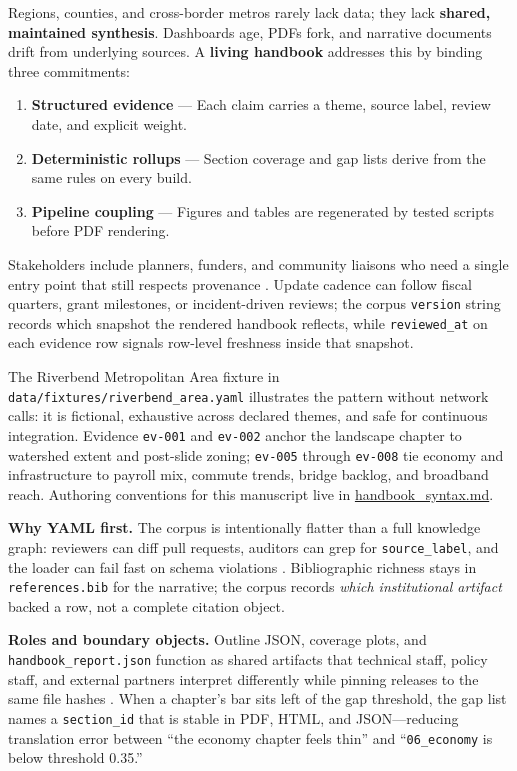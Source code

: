 \documentclass[
]{article}
\providecommand{\tightlist}{%
  \setlength{\itemsep}{0pt}\setlength{\parskip}{0pt}}
\begin{document}
Regions, counties, and cross-border metros rarely lack data; they lack
\textbf{shared, maintained synthesis}. Dashboards age, PDFs fork, and
narrative documents drift from underlying sources. A \textbf{living
handbook} addresses this by binding three commitments:

\begin{enumerate}
\def\labelenumi{\arabic{enumi}.}
\tightlist
\item
  \textbf{Structured evidence} --- Each claim carries a theme, source
  label, review date, and explicit weight.
\item
  \textbf{Deterministic rollups} --- Section coverage and gap lists
  derive from the same rules on every build.
\item
  \textbf{Pipeline coupling} --- Figures and tables are regenerated by
  tested scripts before PDF rendering.
\end{enumerate}

Stakeholders include planners, funders, and community liaisons who need
a single entry point that still respects provenance \citep{gray2005}.
Update cadence can follow fiscal quarters, grant milestones, or
incident-driven reviews; the corpus \texttt{version} string records
which snapshot the rendered handbook reflects, while
\texttt{reviewed\_at} on each evidence row signals row-level freshness
inside that snapshot.

The Riverbend Metropolitan Area fixture in
\texttt{data/fixtures/riverbend\_area.yaml} illustrates the pattern
without network calls: it is fictional, exhaustive across declared
themes, and safe for continuous integration. Evidence \texttt{ev-001}
and \texttt{ev-002} anchor the landscape chapter to watershed extent and
post-slide zoning; \texttt{ev-005} through \texttt{ev-008} tie economy
and infrastructure to payroll mix, commute trends, bridge backlog, and
broadband reach. Authoring conventions for this manuscript live in
\url{handbook_syntax.md}.

\textbf{Why YAML first.} The corpus is intentionally flatter than a full
knowledge graph: reviewers can diff pull requests, auditors can grep for
\texttt{source\_label}, and the loader can fail fast on schema
violations \citep{bowker2005}. Bibliographic richness stays in
\texttt{references.bib} for the narrative; the corpus records
\emph{which institutional artifact} backed a row, not a complete
citation object.

\textbf{Roles and boundary objects.} Outline JSON, coverage plots, and
\texttt{handbook\_report.json} function as shared artifacts that
technical staff, policy staff, and external partners interpret
differently while pinning releases to the same file hashes
\citep{star1989}. When a chapter's bar sits left of the gap threshold,
the gap list names a \texttt{section\_id} that is stable in PDF, HTML,
and JSON---reducing translation error between ``the economy chapter
feels thin'' and ``\texttt{06\_economy} is below threshold 0.35.''
\end{document}
